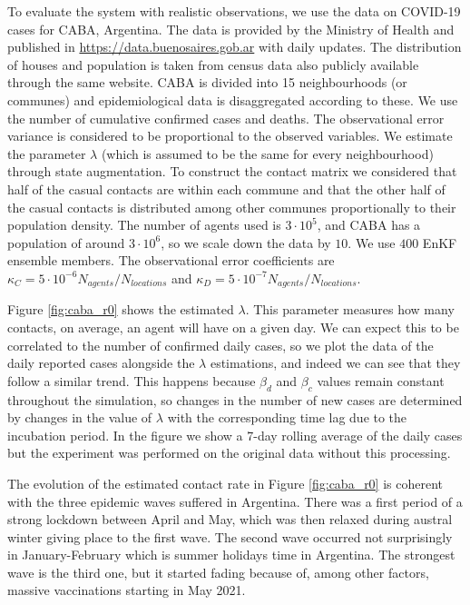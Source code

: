 \documentclass[11pt,a4paper]{article}
\begin{document}
To evaluate the system with realistic observations, we use the data on COVID-19 cases for CABA, Argentina. The data is provided by the Ministry of Health and published in \url{https://data.buenosaires.gob.ar} with daily updates. The distribution of houses and population is taken from census data also publicly available through the same website. CABA is divided into 15 neighbourhoods (or communes) and epidemiological data is disaggregated according to these. We use the number of cumulative confirmed cases and deaths. The observational error variance is considered to be proportional to the observed variables. We estimate the parameter $\lambda$ (which is assumed to be the same for every neighbourhood) through state augmentation. To construct the contact matrix we considered that half of the casual contacts are within each commune and that the other half of the casual contacts is distributed among other communes proportionally to their population density. The number of agents used is $3\cdot 10^5$, and CABA has a population of around $3\cdot 10^6$, so we scale down the data by $10$. We use $400$ EnKF ensemble members. The observational error coefficients are $\kappa_{C} = 5 \cdot 10^{-6} N_{agents}/N_{locations}$ and $\kappa_{D} = 5 \cdot 10^{-7} N_{agents}/N_{locations}$.

Figure \ref{fig:caba_r0} shows the estimated $\lambda$. This parameter measures how many contacts, on average, an agent will have on a given day. We can expect this to be correlated to the number of confirmed daily cases, so we plot the data of the daily reported cases alongside the $\lambda$ estimations, and indeed we can see that they follow a similar trend. This happens because  $\beta_d$ and $\beta_c$ values remain constant throughout the simulation, so changes in the number of new cases are determined by changes in the value of $\lambda$ with the corresponding time lag due to the incubation period. In the figure we show a 7-day rolling average of the daily cases but the experiment was performed on the original data without this processing.

The evolution of the estimated contact rate in Figure \ref{fig:caba_r0} is coherent with the three epidemic waves suffered in Argentina. There was a first period of a strong lockdown between April and May, which was then relaxed during austral winter giving place to the first wave. The second wave occurred not surprisingly in January-February which is summer holidays time in Argentina. The strongest wave is the third one, but it started fading because of, among other factors, massive vaccinations starting in May 2021.
\end{document}
